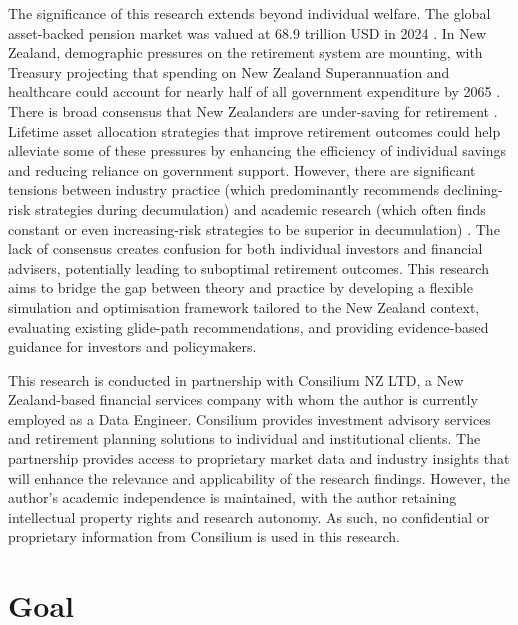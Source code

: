 \documentclass[11pt]{article}
\begin{document}
The significance of this research extends beyond individual welfare. The global asset-backed pension market was valued at 68.9 trillion USD in 2024 \parencite{oecd2025pension}. In New Zealand, demographic pressures on the retirement system are mounting, with Treasury projecting that spending on New Zealand Superannuation and healthcare could account for nearly half of all government expenditure by 2065 \parencite{nztreasury2025tirohanga}. There is broad consensus that New Zealanders are under-saving for retirement \parencite{national2025kiwisaver, gilbert2025lifting, palmer2025watch, dexter2025kiwisaver}. Lifetime asset allocation strategies that improve retirement outcomes could help alleviate some of these pressures by enhancing the efficiency of individual savings and reducing reliance on government support. However, there are significant tensions between industry practice (which predominantly recommends declining-risk strategies during decumulation) and academic research (which often finds constant or even increasing-risk strategies to be superior in decumulation) \parencite[e.g.][]{estrada2014glidepath, estrada2015retirement, anarkulova2025beyond}. The lack of consensus creates confusion for both individual investors and financial advisers, potentially leading to suboptimal retirement outcomes. This research aims to bridge the gap between theory and practice by developing a flexible simulation and optimisation framework tailored to the New Zealand context, evaluating existing glide-path recommendations, and providing evidence-based guidance for investors and policymakers.

This research is conducted in partnership with Consilium NZ LTD, a New Zealand-based financial services company with whom the author is currently employed as a Data Engineer. Consilium provides investment advisory services and retirement planning solutions to individual and institutional clients. The partnership provides access to proprietary market data and industry insights that will enhance the relevance and applicability of the research findings. However, the author's academic independence is maintained, with the author retaining intellectual property rights and research autonomy. As such, no confidential or proprietary information from Consilium is used in this research.


\section{Goal}
\end{document}
